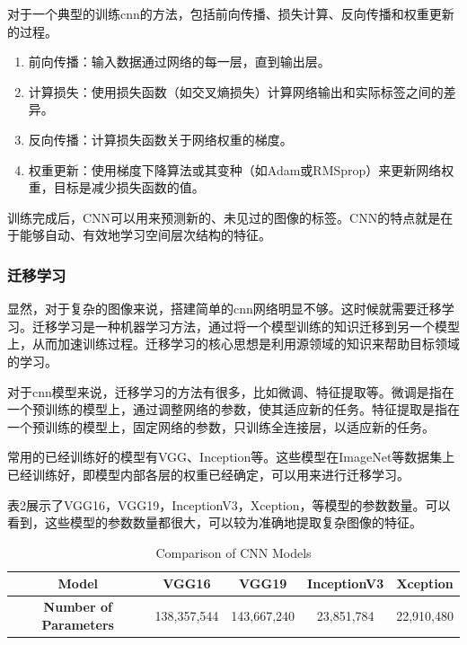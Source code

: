 对于一个典型的训练cnn的方法，包括前向传播、损失计算、反向传播和权重更新的过程。
\begin{enumerate}
    \item 前向传播：输入数据通过网络的每一层，直到输出层。
    \item 计算损失：使用损失函数（如交叉熵损失）计算网络输出和实际标签之间的差异。
    \item 反向传播：计算损失函数关于网络权重的梯度。
    \item 权重更新：使用梯度下降算法或其变种（如Adam或RMSprop）来更新网络权重，目标是减少损失函数的值。
\end{enumerate}
训练完成后，CNN可以用来预测新的、未见过的图像的标签。CNN的特点就是在于能够自动、有效地学习空间层次结构的特征。

\subsubsection{迁移学习}

显然，对于复杂的图像来说，搭建简单的cnn网络明显不够。这时候就需要迁移学习。迁移学习是一种机器学习方法，通过将一个模型训练的知识迁移到另一个模型上，从而加速训练过程。迁移学习的核心思想是利用源领域的知识来帮助目标领域的学习。

对于cnn模型来说，迁移学习的方法有很多，比如微调、特征提取等。微调是指在一个预训练的模型上，通过调整网络的参数，使其适应新的任务。特征提取是指在一个预训练的模型上，固定网络的参数，只训练全连接层，以适应新的任务。

常用的已经训练好的模型有VGG、Inception等。这些模型在ImageNet等数据集上已经训练好，即模型内部各层的权重已经确定，可以用来进行迁移学习。

表2展示了VGG16，VGG19\cite{3.5}，InceptionV3\cite{3.6}，Xception\cite{3.7}，等模型的参数数量。可以看到，这些模型的参数数量都很大，可以较为准确地提取复杂图像的特征。

\begin{table}[htbp]
    \centering
    \caption{Comparison of CNN Models}
    \label{tab:model_comparison}
    \begin{tabular}{ccccc}
        \toprule
        \textbf{Model} & \textbf{VGG16} & \textbf{VGG19} & \textbf{InceptionV3} & \textbf{Xception} \\
        \midrule
        \textbf{Number of Parameters} & 138,357,544 & 143,667,240 & 23,851,784 & 22,910,480 \\
        \bottomrule
    \end{tabular}
\end{table}


\FloatBarrier






